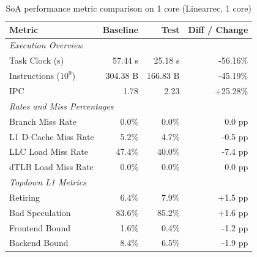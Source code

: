 \begin{table}[htbp]
  \centering
  \caption{SoA performance metric comparison on 1 core (Linearrec, 1 core)}
  \label{tab:perf_comparison_soa_linearrec_1core}
  \begin{tabular}{lrrr}
    \toprule
    \textbf{Metric} & \textbf{Baseline} & \textbf{Test} & \textbf{Diff / Change} \\
    \midrule
    \multicolumn{4}{l}{\textit{Execution Overview}} \\
    \quad Task Clock (s)           & 57.44 s   & 25.18 s   & -56.16\%   \\
    \quad Instructions ($10^9$)    & 304.38 B  & 166.83 B  & -45.19\%   \\
    \quad IPC                      & 1.78       & 2.23       & +25.28\%    \\
    \midrule
    \multicolumn{4}{l}{\textit{Rates and Miss Percentages}} \\
    \quad Branch Miss Rate         & 0.0\%      & 0.0\%      & 0.0 pp     \\
    \quad L1 D-Cache Miss Rate     & 5.2\%      & 4.7\%      & -0.5 pp    \\
    \quad LLC Load Miss Rate       & 47.4\%     & 40.0\%     & -7.4 pp    \\
    \quad dTLB Load Miss Rate      & 0.0\%      & 0.0\%      & 0.0 pp     \\
    \midrule
    \multicolumn{4}{l}{\textit{Topdown L1 Metrics}} \\
    \quad Retiring                 & 6.4\%      & 7.9\%      & +1.5 pp    \\
    \quad Bad Speculation          & 83.6\%     & 85.2\%     & +1.6 pp   \\
    \quad Frontend Bound           & 1.6\%      & 0.4\%      & -1.2 pp    \\
    \quad Backend Bound            & 8.4\%      & 6.5\%      & -1.9 pp    \\
    \bottomrule
  \end{tabular}
\end{table}


